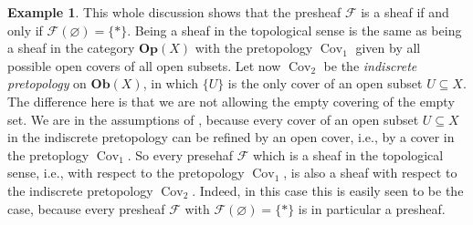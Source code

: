 \documentclass[12pt,reqno,a4paper]{amsart}
\theoremstyle{plain}
\theoremstyle{definition}
\newtheorem{exmp}[thm]{Example}
\theoremstyle{remark}
\begin{document}
\begin{exmp}
  This whole discussion shows that the presheaf $\mathscr{F}$ is a sheaf if and only if $\mathscr{F}(\varnothing) = \{ * \}$.
  Being a sheaf in the topological sense is the same as being a sheaf in the category $\mathbf{Op}(X)$ with the pretopology $\operatorname{Cov}_{1}$ given by all possible open covers of all open subsets.
  Let now $\operatorname{Cov}_{2}$ be the \textit{indiscrete pretopology} on $\mathbf{Ob}(X)$,
  in which $\{ U \}$ is the only cover of an open subset $U \subseteq X$.
  The difference here is that we are not allowing the empty covering of the empty set.
  We are in the assumptions of , because every cover of an open subset $U \subseteq X$ in the indiscrete pretopology can be refined by an open cover, i.e., by a cover in the pretoplogy $\operatorname{Cov}_{1}$.
  So every presehaf $\mathscr{F}$ which is a sheaf in the topological sense, i.e., with respect to the pretopology $\operatorname{Cov}_{1}$, is also a sheaf with respect to the indiscrete pretopology $\operatorname{Cov}_{2}$.
  Indeed, in this case this is easily seen to be the case, because every presheaf $\mathscr{F}$ with $\mathscr{F}(\varnothing) = \{ * \}$ is in particular a presheaf.
\end{exmp}
\end{document}
